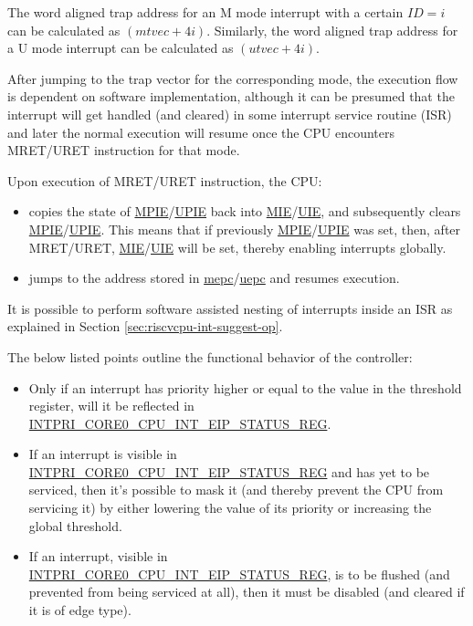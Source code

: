 \documentclass[main\_\_EN.tex]{subfiles}
\begin{document}
The word aligned trap address for an M mode interrupt with a certain $ID=i$ can be calculated as $(\hyperref[fielddesc:MTVECBASE]{mtvec} + 4i)$. Similarly, the word aligned trap address for a U mode interrupt can be calculated as $(\hyperref[fielddesc:UTVECBASE]{utvec} + 4i)$.

After jumping to the trap vector for the corresponding mode, the execution flow is dependent on software implementation, although it can be presumed that the interrupt will get handled (and cleared) in some interrupt service routine (ISR) and later the normal execution will resume once the CPU encounters MRET/URET instruction for that mode.

Upon execution of MRET/URET instruction, the CPU:
\begin{itemize}
    \item copies the state of \hyperref[fielddesc:MSTATUSMPIE]{MPIE}/\hyperref[fielddesc:MSTATUSUPIE]{UPIE} back into \hyperref[fielddesc:MSTATUSMIE]{MIE}/\hyperref[fielddesc:USTATUSUIE]{UIE}, and subsequently clears \hyperref[fielddesc:MSTATUSMPIE]{MPIE}/\hyperref[fielddesc:USTATUSUPIE]{UPIE}. This means that if previously \hyperref[fielddesc:MSTATUSMPIE]{MPIE}/\hyperref[fielddesc:USTATUSUPIE]{UPIE} was set, then, after MRET/URET, \hyperref[fielddesc:MSTATUSMIE]{MIE}/\hyperref[fielddesc:USTATUSUIE]{UIE} will be set, thereby enabling interrupts globally.
    \item jumps to the address stored in \hyperref[regdesc:MEPC]{mepc}/\hyperref[regdesc:UEPC]{uepc} and resumes execution.
\end{itemize}

It is possible to perform software assisted nesting of interrupts inside an ISR as explained in Section \ref{sec:riscvcpu-int-suggest-op}.

The below listed points outline the functional behavior of the controller:

\begin{itemize}
    \item Only if an interrupt has priority higher or equal to the value in the threshold register, will it be reflected in \hyperref[regdesc:INTPRICORE0CPUINTEIPSTATUSREG]{INTPRI\_CORE0\_CPU\_INT\_EIP\_STATUS\_REG}.
    \item If an interrupt is visible in \hyperref[regdesc:INTPRICORE0CPUINTEIPSTATUSREG]{INTPRI\_CORE0\_CPU\_INT\_EIP\_STATUS\_REG} and has yet to be serviced, then it's possible to mask it (and thereby prevent the CPU from servicing it) by either lowering the value of its priority or increasing the global threshold.
    \item If an interrupt, visible in \hyperref[regdesc:INTPRICORE0CPUINTEIPSTATUSREG]{INTPRI\_CORE0\_CPU\_INT\_EIP\_STATUS\_REG}, is to be flushed (and prevented from being serviced at all), then it must be disabled (and cleared if it is of edge type).
\end{itemize}
\end{document}
